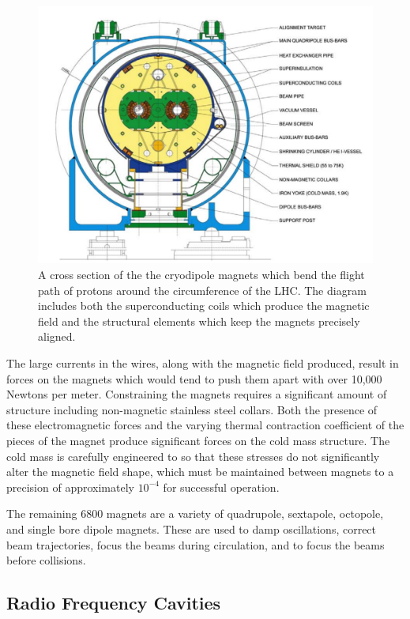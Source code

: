\begin{figure}
\centering
\includegraphics[width=\fullfig]{figures/dipole_magnet.png}
\caption{A cross section of the the cryodipole magnets which bend the flight path of protons around the circumference of the \ac{LHC}. The diagram includes both the superconducting coils which produce the magnetic field and the structural elements which keep the magnets precisely aligned.}
\label{fig:dipole_magnet}

\end{figure}

The large currents in the wires, along with the magnetic field produced, result in forces on the magnets which would tend to push them apart with over 10,000 Newtons per meter.
Constraining the magnets requires a significant amount of structure including non-magnetic stainless steel collars. 
Both the presence of these electromagnetic forces and the varying thermal contraction coefficient of the pieces of the magnet produce significant forces on the cold mass structure. 
The cold mass is carefully engineered to so that these stresses do not significantly alter the magnetic field shape, which must be maintained between magnets to a precision of approximately $10^{-4}$ for successful operation.

The remaining 6800 magnets are a variety of quadrupole, sextapole, octopole, and single bore dipole magnets.
These are used to damp oscillations, correct beam trajectories, focus the beams during circulation, and to focus the beams before collisions.

\subsection{Radio Frequency Cavities}
\label{sec:rfcavity}

